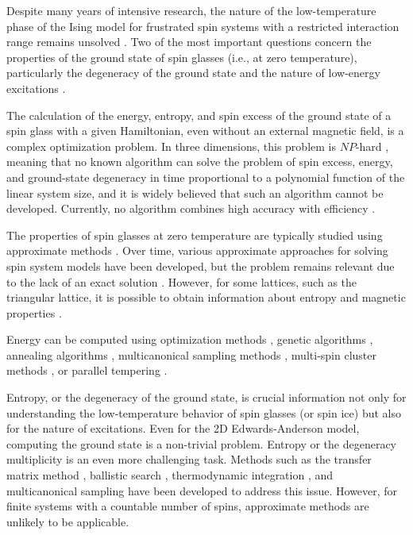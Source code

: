 \documentclass[preprint,12pt]{elsarticle}
\begin{document}
Despite many years of intensive research, the nature of the low-temperature phase of the Ising model for frustrated spin systems with a restricted interaction range remains unsolved \cite{roma2010ground, newman2023proof}. Two of the most important questions concern the properties of the ground state of spin glasses (i.e., at zero temperature), particularly the degeneracy of the ground state and the nature of low-energy excitations \cite{newman2022ground}.

The calculation of the energy, entropy, and spin excess of the ground state of a spin glass with a given Hamiltonian, even without an external magnetic field, is a complex optimization problem. In three dimensions, this problem is $NP$-hard \cite{barahona1982computational, hartmann2002optimization}, meaning that no known algorithm can solve the problem of spin excess, energy, and ground-state degeneracy in time proportional to a polynomial function of the linear system size, and it is widely believed that such an algorithm cannot be developed. Currently, no algorithm combines high accuracy with efficiency \cite{fan2023searching}.

The properties of spin glasses at zero temperature are typically studied using approximate methods \cite{roma2009ground, perez2012ground}. Over time, various approximate approaches for solving spin system models have been developed, but the problem remains relevant due to the lack of an exact solution \cite{rybin2022hybrid, makarova2023canonical, farias2024differentiable, jabar2024magnetic}. However, for some lattices, such as the triangular lattice, it is possible to obtain information about entropy and magnetic properties \cite{jurvcivsinova2024classical}.

Energy can be computed using optimization methods \cite{hartmann2002optimization, hartmann2004new}, genetic algorithms \cite{holland1992adaptation}, annealing algorithms \cite{kirkpatrick1983optimization}, multicanonical sampling methods \cite{berg1994ground, shevchenko2017multicanonical}, multi-spin cluster methods \cite{makarova2023canonical}, or parallel tempering \cite{PhysRevB.50.16444, roma2009ground}.

Entropy, or the degeneracy of the ground state, is crucial information not only for understanding the low-temperature behavior of spin glasses (or spin ice) but also for the nature of excitations. Even for the 2D Edwards-Anderson model, computing the ground state is a non-trivial problem. Entropy or the degeneracy multiplicity is an even more challenging task. Methods such as the transfer matrix method \cite{PhysRevB.22.288, cheung1983equilibrium, kolan1982ground}, ballistic search \cite{hartmann2000ground}, thermodynamic integration \cite{kirkpatrick1977frustration, binder1985monte, roma2004ground}, and multicanonical sampling \cite{berg1994ground, shevchenko2017multicanonical} have been developed to address this issue. However, for finite systems with a countable number of spins, approximate methods are unlikely to be applicable.  
\end{document}
